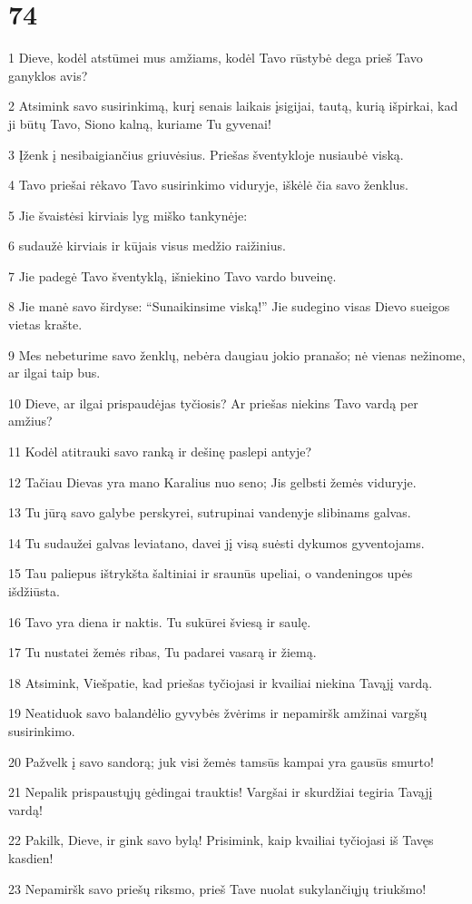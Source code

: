\chapter{74}


\par 1 Dieve, kodėl atstūmei mus amžiams, kodėl Tavo rūstybė dega prieš Tavo ganyklos avis? 
\par 2 Atsimink savo susirinkimą, kurį senais laikais įsigijai, tautą, kurią išpirkai, kad ji būtų Tavo, Siono kalną, kuriame Tu gyvenai! 
\par 3 Įženk į nesibaigiančius griuvėsius. Priešas šventykloje nusiaubė viską. 
\par 4 Tavo priešai rėkavo Tavo susirinkimo viduryje, iškėlė čia savo ženklus. 
\par 5 Jie švaistėsi kirviais lyg miško tankynėje: 
\par 6 sudaužė kirviais ir kūjais visus medžio raižinius. 
\par 7 Jie padegė Tavo šventyklą, išniekino Tavo vardo buveinę. 
\par 8 Jie manė savo širdyse: “Sunaikinsime viską!” Jie sudegino visas Dievo sueigos vietas krašte. 
\par 9 Mes nebeturime savo ženklų, nebėra daugiau jokio pranašo; nė vienas nežinome, ar ilgai taip bus. 
\par 10 Dieve, ar ilgai prispaudėjas tyčiosis? Ar priešas niekins Tavo vardą per amžius? 
\par 11 Kodėl atitrauki savo ranką ir dešinę paslepi antyje? 
\par 12 Tačiau Dievas yra mano Karalius nuo seno; Jis gelbsti žemės viduryje. 
\par 13 Tu jūrą savo galybe perskyrei, sutrupinai vandenyje slibinams galvas. 
\par 14 Tu sudaužei galvas leviatano, davei jį visą suėsti dykumos gyventojams. 
\par 15 Tau paliepus ištrykšta šaltiniai ir sraunūs upeliai, o vandeningos upės išdžiūsta. 
\par 16 Tavo yra diena ir naktis. Tu sukūrei šviesą ir saulę. 
\par 17 Tu nustatei žemės ribas, Tu padarei vasarą ir žiemą. 
\par 18 Atsimink, Viešpatie, kad priešas tyčiojasi ir kvailiai niekina Tavąjį vardą. 
\par 19 Neatiduok savo balandėlio gyvybės žvėrims ir nepamiršk amžinai vargšų susirinkimo. 
\par 20 Pažvelk į savo sandorą; juk visi žemės tamsūs kampai yra gausūs smurto! 
\par 21 Nepalik prispaustųjų gėdingai trauktis! Vargšai ir skurdžiai tegiria Tavąjį vardą! 
\par 22 Pakilk, Dieve, ir gink savo bylą! Prisimink, kaip kvailiai tyčiojasi iš Tavęs kasdien! 
\par 23 Nepamiršk savo priešų riksmo, prieš Tave nuolat sukylančiųjų triukšmo!



